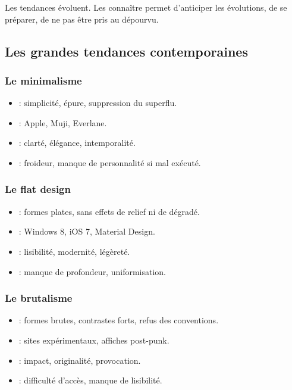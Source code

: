 Les tendances évoluent. Les connaître permet d'anticiper les évolutions, de se préparer, de ne pas être pris au dépourvu.

\subsection{Les grandes tendances contemporaines}

\subsubsection{Le minimalisme}

\begin{itemize}
    \item {} : simplicité, épure, suppression du superflu.
    \item {} : Apple, Muji, Everlane.
    \item {} : clarté, élégance, intemporalité.
    \item {} : froideur, manque de personnalité si mal exécuté.
\end{itemize}

\subsubsection{Le flat design}

\begin{itemize}
    \item {} : formes plates, sans effets de relief ni de dégradé.
    \item {} : Windows 8, iOS 7, Material Design.
    \item {} : lisibilité, modernité, légèreté.
    \item {} : manque de profondeur, uniformisation.
\end{itemize}

\subsubsection{Le brutalisme}

\begin{itemize}
    \item {} : formes brutes, contrastes forts, refus des conventions.
    \item {} : sites expérimentaux, affiches post-punk.
    \item {} : impact, originalité, provocation.
    \item {} : difficulté d'accès, manque de lisibilité.
\end{itemize}

